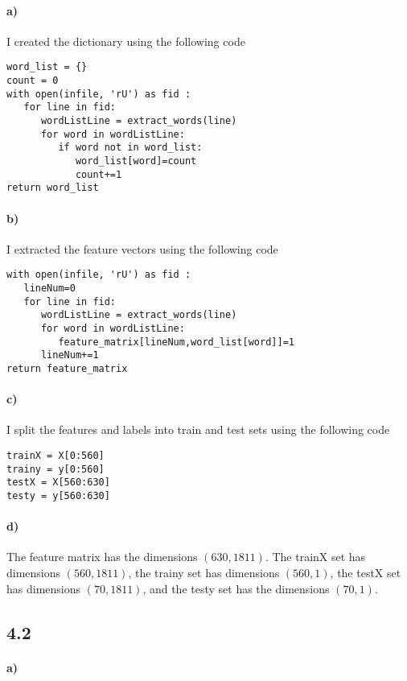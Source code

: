 \documentclass[12pt]{article}
\begin{document}
\paragraph{a)}

I created the dictionary using the following code
\begin{verbatim}
word_list = {}
count = 0
with open(infile, 'rU') as fid :
   for line in fid:
      wordListLine = extract_words(line)
      for word in wordListLine:
         if word not in word_list:
            word_list[word]=count
            count+=1
return word_list
\end{verbatim}

\paragraph{b)}

I extracted the feature vectors using the following code
\begin{verbatim}
with open(infile, 'rU') as fid :
   lineNum=0
   for line in fid:
      wordListLine = extract_words(line)
      for word in wordListLine:
         feature_matrix[lineNum,word_list[word]]=1
      lineNum+=1
return feature_matrix
\end{verbatim}

\paragraph{c)}

I split the features and labels into train and test sets using the following code
\begin{verbatim}
trainX = X[0:560]
trainy = y[0:560]
testX = X[560:630]
testy = y[560:630]
\end{verbatim}

\paragraph{d)}

The feature matrix has the dimensions \((630,1811)\). The trainX set has dimensions \((560,1811)\), the trainy set has
dimensions \((560,1)\), the testX set has dimensions \((70,1811)\), and the testy set has the dimensions \((70,1)\).

\subsection*{4.2}

\paragraph{a)}
\end{document}
